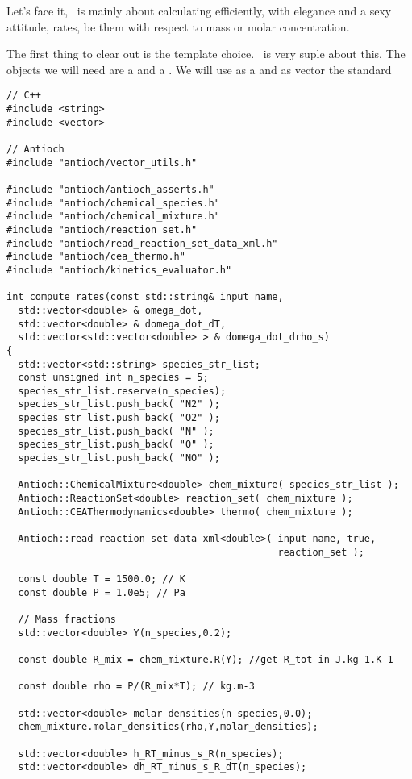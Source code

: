 Let's face it, \Antioch\ is mainly about calculating
efficiently, with elegance and a sexy attitude, rates,
be them with respect to mass or molar concentration. 

The first thing to clear out is the template choice. 
\Antioch\ is very suple about this, 
The objects we will need are
a  and a . We will
use as  a  and as vector the standard 

\begin{verbatim}
// C++
#include <string>
#include <vector>

// Antioch
#include "antioch/vector_utils.h"

#include "antioch/antioch_asserts.h"
#include "antioch/chemical_species.h"
#include "antioch/chemical_mixture.h"
#include "antioch/reaction_set.h"
#include "antioch/read_reaction_set_data_xml.h"
#include "antioch/cea_thermo.h"
#include "antioch/kinetics_evaluator.h"

int compute_rates(const std::string& input_name,
  std::vector<double> & omega_dot,
  std::vector<double> & domega_dot_dT,
  std::vector<std::vector<double> > & domega_dot_drho_s)
{
  std::vector<std::string> species_str_list;
  const unsigned int n_species = 5;
  species_str_list.reserve(n_species);
  species_str_list.push_back( "N2" );
  species_str_list.push_back( "O2" );
  species_str_list.push_back( "N" );
  species_str_list.push_back( "O" );
  species_str_list.push_back( "NO" );

  Antioch::ChemicalMixture<double> chem_mixture( species_str_list );
  Antioch::ReactionSet<double> reaction_set( chem_mixture );
  Antioch::CEAThermodynamics<double> thermo( chem_mixture );

  Antioch::read_reaction_set_data_xml<double>( input_name, true, 
                                               reaction_set );

  const double T = 1500.0; // K
  const double P = 1.0e5; // Pa

  // Mass fractions
  std::vector<double> Y(n_species,0.2);

  const double R_mix = chem_mixture.R(Y); //get R_tot in J.kg-1.K-1

  const double rho = P/(R_mix*T); // kg.m-3

  std::vector<double> molar_densities(n_species,0.0);
  chem_mixture.molar_densities(rho,Y,molar_densities);

  std::vector<double> h_RT_minus_s_R(n_species);
  std::vector<double> dh_RT_minus_s_R_dT(n_species);


\end{verbatim}
